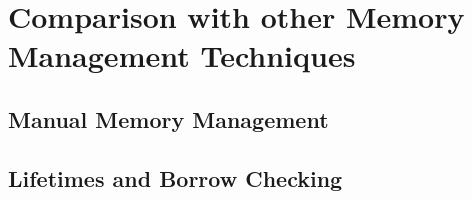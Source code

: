 \chapter{Comparison with other Memory Management Techniques}

\section{Manual Memory Management}

\section{Lifetimes and Borrow Checking}

